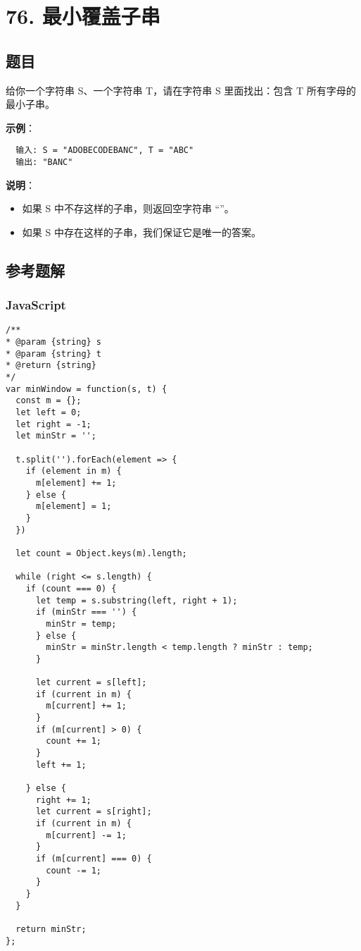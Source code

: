 \newpage
\section{76. 最小覆盖子串}
\label{leetcode:76}

\subsection{题目}

给你一个字符串 S、一个字符串 T，请在字符串 S 里面找出：包含 T 所有字母的最小子串。

\textbf{示例}：

\begin{verbatim}
  输入: S = "ADOBECODEBANC", T = "ABC"
  输出: "BANC"
\end{verbatim}

\textbf{说明}：

\begin{itemize}
  \item 如果 S 中不存这样的子串，则返回空字符串 ``''。
  \item 如果 S 中存在这样的子串，我们保证它是唯一的答案。
\end{itemize}

\subsection{参考题解}

\subsubsection{JavaScript}

\begin{verbatim}
/**
* @param {string} s
* @param {string} t
* @return {string}
*/
var minWindow = function(s, t) {
  const m = {};
  let left = 0;
  let right = -1;
  let minStr = '';

  t.split('').forEach(element => {
    if (element in m) {
      m[element] += 1;
    } else {
      m[element] = 1;
    }
  })

  let count = Object.keys(m).length;

  while (right <= s.length) {
    if (count === 0) {
      let temp = s.substring(left, right + 1);
      if (minStr === '') {
        minStr = temp;
      } else {
        minStr = minStr.length < temp.length ? minStr : temp;
      }

      let current = s[left];
      if (current in m) {
        m[current] += 1;
      }
      if (m[current] > 0) {
        count += 1;
      }
      left += 1;

    } else {
      right += 1;
      let current = s[right];
      if (current in m) {
        m[current] -= 1;
      }
      if (m[current] === 0) {
        count -= 1;
      }
    }
  }

  return minStr;
};
\end{verbatim}

